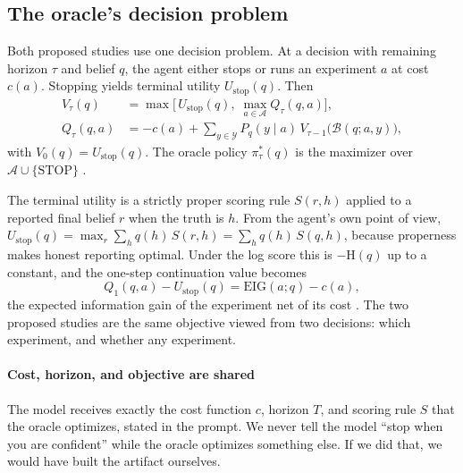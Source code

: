 \documentclass[10pt,letterpaper,twocolumn]{article}
\newcommand{\Aset}{\mathcal{A}}
\newcommand{\Yset}{\mathcal{Y}}
\newcommand{\STOP}{\mathrm{STOP}}
\newcommand{\Ustop}{U_{\mathrm{stop}}}
\newcommand{\Bop}{\mathcal{B}}
\begin{document}
\subsection{The oracle's decision problem}
\label{sec:dp}
Both proposed studies use one decision problem. At a decision with remaining horizon $\tau$ and belief $q$, the agent either stops or runs an experiment $a$ at cost $c(a)$. Stopping yields terminal utility $\Ustop(q)$. Then
\begin{align}
V_\tau(q) &= \max\Big[\, \Ustop(q),\; \max_{a\in\Aset} Q_\tau(q,a) \Big], \label{eq:V}\\
Q_\tau(q,a) &= -c(a) + \sum_{y\in\Yset} P_q(y\mid a)\, V_{\tau-1}\big(\Bop(q;a,y)\big), \label{eq:Q}
\end{align}
with $V_0(q) = \Ustop(q)$. The oracle policy $\pi^*_\tau(q)$ is the maximizer over $\Aset \cup \{\STOP\}$ \citep{wald1947sequential,degroot1970optimal}.

The terminal utility is a strictly proper scoring rule $S(r,h)$ \citep{gneiting2007strictly} applied to a reported final belief $r$ when the truth is $h$. From the agent's own point of view, $\Ustop(q) = \max_r \sum_h q(h)\,S(r,h) = \sum_h q(h)\,S(q,h)$, because properness makes honest reporting optimal. Under the log score this is $-\mathrm{H}(q)$ up to a constant, and the one-step continuation value becomes
\begin{equation}
Q_1(q,a) - \Ustop(q) = \mathrm{EIG}(a;q) - c(a),
\label{eq:eig}
\end{equation}
the expected information gain of the experiment net of its cost \citep{lindley1956measure,howard1966information}. The two proposed studies are the same objective viewed from two decisions: which experiment, and whether any experiment.

\paragraph{Cost, horizon, and objective are shared}
The model receives exactly the cost function $c$, horizon $T$, and scoring rule $S$ that the oracle optimizes, stated in the prompt. We never tell the model ``stop when you are confident'' while the oracle optimizes something else. If we did that, we would have built the artifact ourselves.
\end{document}
